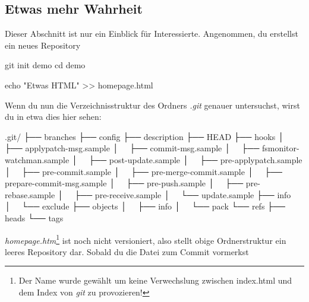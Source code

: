 \documentclass[
  letterpaper,
  DIV=11]{scrreprt}
\newenvironment{Shaded}{\begin{snugshade}}{\end{snugshade}}
\newcommand{\BuiltInTok}[1]{\textcolor[rgb]{0.00,0.23,0.31}{#1}}
\newcommand{\ExtensionTok}[1]{\textcolor[rgb]{0.00,0.23,0.31}{#1}}
\newcommand{\FunctionTok}[1]{\textcolor[rgb]{0.28,0.35,0.67}{#1}}
\newcommand{\NormalTok}[1]{\textcolor[rgb]{0.00,0.23,0.31}{#1}}
\newcommand{\OperatorTok}[1]{\textcolor[rgb]{0.37,0.37,0.37}{#1}}
\newcommand{\StringTok}[1]{\textcolor[rgb]{0.13,0.47,0.30}{#1}}
\newcommand{\git}{\textit{git}\xspace}
\newcommand{\datei}[1]{\textit{#1}\xspace}
\begin{document}
\subsection{Etwas mehr Wahrheit}\label{etwas-mehr-wahrheit}

Dieser Abschnitt ist nur ein Einblick für Interessierte. Angenommen, du
erstellst ein neues Repository

\begin{Shaded}
\begin{Highlighting}[]
\FunctionTok{git}\NormalTok{ init demo }
\BuiltInTok{cd}\NormalTok{ demo}

\BuiltInTok{echo} \StringTok{"Etwas HTML"} \OperatorTok{\textgreater{}\textgreater{}}\NormalTok{ homepage.html}
\end{Highlighting}
\end{Shaded}

Wenn du nun die Verzeichnisstruktur des Ordners \emph{.git} genauer
untersuchst, wirst du in etwa dies hier sehen:

\begin{Shaded}
\begin{Highlighting}[]
\ExtensionTok{.git/}
\ExtensionTok{├──}\NormalTok{ branches}
\ExtensionTok{├──}\NormalTok{ config}
\ExtensionTok{├──}\NormalTok{ description}
\ExtensionTok{├──}\NormalTok{ HEAD}
\ExtensionTok{├──}\NormalTok{ hooks}
\ExtensionTok{│  }\NormalTok{ ├── applypatch{-}msg.sample}
\ExtensionTok{│  }\NormalTok{ ├── commit{-}msg.sample}
\ExtensionTok{│  }\NormalTok{ ├── fsmonitor{-}watchman.sample}
\ExtensionTok{│  }\NormalTok{ ├── post{-}update.sample}
\ExtensionTok{│  }\NormalTok{ ├── pre{-}applypatch.sample}
\ExtensionTok{│  }\NormalTok{ ├── pre{-}commit.sample}
\ExtensionTok{│  }\NormalTok{ ├── pre{-}merge{-}commit.sample}
\ExtensionTok{│  }\NormalTok{ ├── prepare{-}commit{-}msg.sample}
\ExtensionTok{│  }\NormalTok{ ├── pre{-}push.sample}
\ExtensionTok{│  }\NormalTok{ ├── pre{-}rebase.sample}
\ExtensionTok{│  }\NormalTok{ ├── pre{-}receive.sample}
\ExtensionTok{│  }\NormalTok{ └── update.sample}
\ExtensionTok{├──}\NormalTok{ info}
\ExtensionTok{│  }\NormalTok{ └── exclude}
\ExtensionTok{├──}\NormalTok{ objects}
\ExtensionTok{│  }\NormalTok{ ├── info}
\ExtensionTok{│  }\NormalTok{ └── pack}
\ExtensionTok{└──}\NormalTok{ refs}
    \ExtensionTok{├──}\NormalTok{ heads}
    \ExtensionTok{└──}\NormalTok{ tags}
\end{Highlighting}
\end{Shaded}

\datei{homepage.htm}\footnote{Der Name wurde gewählt um keine
  Verwechslung zwischen index.html und dem Index von \git zu
  provozieren!} ist noch nicht versioniert, also stellt obige
Ordnerstruktur ein leeres Repository dar. Sobald du die Datei zum Commit
vormerkst
\end{document}
